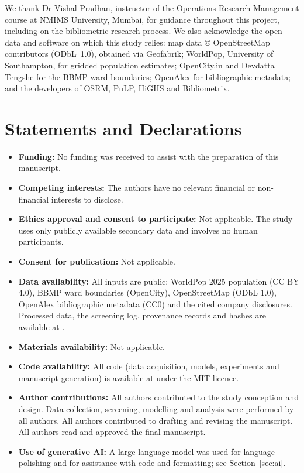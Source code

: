 We thank Dr Vishal Pradhan, instructor of the Operations Research Management course at NMIMS University, Mumbai, for guidance throughout this project, including on the bibliometric research process. We also acknowledge the open data and software on which this study relies: map data \copyright{} OpenStreetMap contributors (ODbL~1.0), obtained via Geofabrik; WorldPop, University of Southampton, for gridded population estimates; OpenCity.in and Devdatta Tengshe for the BBMP ward boundaries; OpenAlex for bibliographic metadata; and the developers of OSRM, PuLP, HiGHS and Bibliometrix.

\section*{Statements and Declarations}

\begin{itemize}
\item \textbf{Funding:} No funding was received to assist with the preparation of this manuscript.
\item \textbf{Competing interests:} The authors have no relevant financial or non-financial interests to disclose.
\item \textbf{Ethics approval and consent to participate:} Not applicable. The study uses only publicly available secondary data and involves no human participants.
\item \textbf{Consent for publication:} Not applicable.
\item \textbf{Data availability:} All inputs are public: WorldPop 2025 population (CC BY 4.0), BBMP ward boundaries (OpenCity), OpenStreetMap (ODbL 1.0), OpenAlex bibliographic metadata (CC0) and the cited company disclosures. Processed data, the screening log, provenance records and hashes are available at \RepoURL.
\item \textbf{Materials availability:} Not applicable.
\item \textbf{Code availability:} All code (data acquisition, models, experiments and manuscript generation) is available at \RepoURL{} under the MIT licence.
\item \textbf{Author contributions:} All authors contributed to the study conception and design. Data collection, screening, modelling and analysis were performed by all authors. All authors contributed to drafting and revising the manuscript. All authors read and approved the final manuscript.
\item \textbf{Use of generative AI:} A large language model was used for language polishing and for assistance with code and formatting; see Section~\ref{sec:ai}.
\end{itemize}
